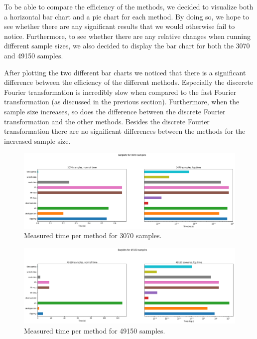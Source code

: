 \documentclass[a4paper,11pt]{report}
\begin{document}
    To be able to compare the efficiency of the methods, we decided to visualize both a horizontal bar chart and a pie chart for each method. By doing so, we hope to see whether
    there are any significant results that we would otherwise fail to notice. Furthermore, to see whether there are any relative changes when running different sample sizes, we
    also decided to display the bar chart for both the 3070 and 49150 samples.

    After plotting the two different bar charts we noticed that there is a significant difference between the efficiency of the different methods. Especially the discerete Fourier
    transformation is incredibly slow when compared to the fast Fourier transformation (as discussed in the previous section). Furthermore, when the sample size increases, so does the difference
    between the discrete Fourier transformation and the other methods. Besides the discrete Fourier transformation there are no significant differences between the methods for the increased sample size.

    \begin{figure}[h!]
        \centering
        \includegraphics[width=1.2\columnwidth]{barchart_3070}
        \caption{Measured time per method for 3070 samples.}
    \end{figure}


    \begin{figure}[h!]
        \centering
        \includegraphics[width=1.2\columnwidth]{barchart_49150}
        \caption{Measured time per method for 49150 samples.}
    \end{figure}
\end{document}
